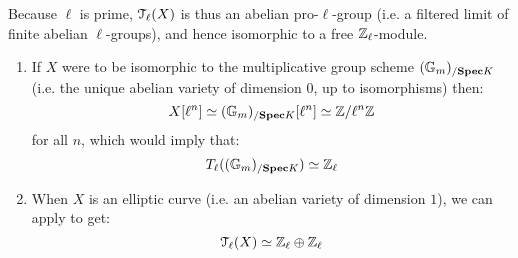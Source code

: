 \begin{example}
\begin{enumerate}
\begin{itemize}
                            Because $\ell$ is prime, $\mathcal{T}_{\ell}(X)$ is thus an abelian pro-$\ell$-group (i.e. a filtered limit of finite abelian $\ell$-groups), and hence isomorphic to a free $\mathbb{Z}_{\ell}$-module. 
                                \begin{enumerate}
                                    \item If $X$ were to be isomorphic to the multiplicative group scheme $(\mathbb{G}_m)_{/\mathbf{Spec} K}$ (i.e. the unique abelian variety of dimension $0$, up to isomorphisms) then:
                                        $$X[\ell^n] \simeq (\mathbb{G}_m)_{/\mathbf{Spec} K}[\ell^n] \simeq \mathbb{Z}/\ell^n\mathbb{Z}$$
                                    for all $n$, which would imply that:
                                        $$T_{\ell}( (\mathbb{G}_m)_{/\mathbf{Spec} K} ) \simeq \mathbb{Z}_{\ell}$$
                                    \item When $X$ is an elliptic curve (i.e. an abelian variety of dimension $1$), we can apply \cite[Corollary 6.4]{silverman_elliptic_curves} to get:
                                        $$\mathcal{T}_{\ell}(X) \simeq \mathbb{Z}_{\ell} \oplus \mathbb{Z}_{\ell}$$
                                \end{enumerate}
                        \end{itemize}
                \end{enumerate}
            \end{example}
        
